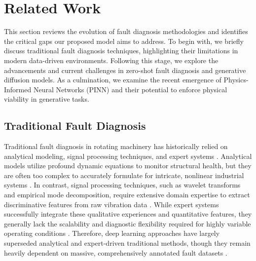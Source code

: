 \section{Related Work}
\label{sec:related}

This section reviews the evolution of fault diagnosis methodologies and identifies the critical gaps our proposed model aims to address. To begin with, we briefly discuss traditional fault diagnosis techniques, highlighting their limitations in modern data-driven environments. Following this stage, we explore the advancements and current challenges in zero-shot fault diagnosis and generative diffusion models. As a culmination, we examine the recent emergence of Physics-Informed Neural Networks (PINN) and their potential to enforce physical viability in generative tasks.

\subsection{Traditional Fault Diagnosis}
Traditional fault diagnosis in rotating machinery has historically relied on analytical modeling, signal processing techniques, and expert systems \cite{randall2011rolling,jardine2006review}. Analytical models utilize profound dynamic equations to monitor structural health, but they are often too complex to accurately formulate for intricate, nonlinear industrial systems \cite{jardine2006review}. In contrast, signal processing techniques, such as wavelet transforms and empirical mode decomposition, require extensive domain expertise to extract discriminative features from raw vibration data \cite{yan2014wavelets}. While expert systems successfully integrate these qualitative experiences and quantitative features, they generally lack the scalability and diagnostic flexibility required for highly variable operating conditions \cite{zhao2019deep}. Therefore, deep learning approaches have largely superseded analytical and expert-driven traditional methods, though they remain heavily dependent on massive, comprehensively annotated fault datasets \cite{lei2020applications}.


